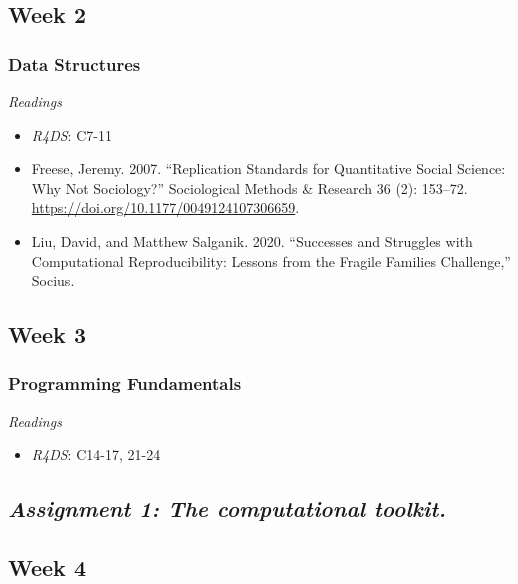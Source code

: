 \documentclass[
  10pt,
]{article}
\providecommand{\tightlist}{%
  \setlength{\itemsep}{0pt}\setlength{\parskip}{0pt}}
\begin{document}
\hypertarget{week-2}{%
\subsection{Week 2}\label{week-2}}

\hypertarget{data-structures}{%
\subsubsection{Data Structures}\label{data-structures}}

\emph{Readings}

\begin{itemize}
\tightlist
\item
  \emph{R4DS}: C7-11
\item
  Freese, Jeremy. 2007. ``Replication Standards for Quantitative Social
  Science: Why Not Sociology?'' Sociological Methods \& Research 36 (2):
  153--72. \url{https://doi.org/10.1177/0049124107306659}.
\item
  Liu, David, and Matthew Salganik. 2020. ``Successes and Struggles with
  Computational Reproducibility: Lessons from the Fragile Families
  Challenge,'' Socius.
\end{itemize}

\hypertarget{week-3}{%
\subsection{Week 3}\label{week-3}}

\hypertarget{programming-fundamentals}{%
\subsubsection{Programming
Fundamentals}\label{programming-fundamentals}}

\emph{Readings}

\begin{itemize}
\tightlist
\item
  \emph{R4DS}: C14-17, 21-24
\end{itemize}

\hypertarget{assignment-1-the-computational-toolkit.}{%
\subsection{\texorpdfstring{\emph{Assignment 1: The computational
toolkit.}}{Assignment 1: The computational toolkit.}}\label{assignment-1-the-computational-toolkit.}}

\hypertarget{week-4}{%
\subsection{Week 4}\label{week-4}}
\end{document}
